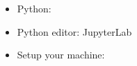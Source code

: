 \begin{frame}
\begin{itemize}
\begin{itemize}
\item Python: 
\item Python editor: JupyterLab  
\item Setup your machine: 
 \myurl{\homepagesetup}
 \end{itemize}
 \end{itemize}
\end{frame}